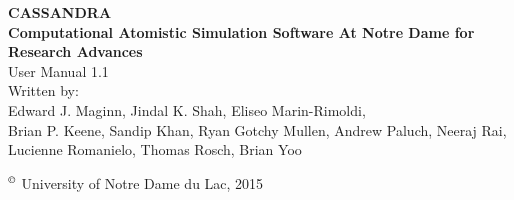 \begin{center}
\vspace*{2 in}
{\huge{\bf CASSANDRA} }\\ 
\vspace{0.5in}
{\huge { \bf  Computational Atomistic Simulation Software At Notre Dame for Research Advances}} \\
\vspace{1 in}
User Manual 1.1 \\ 
\vspace{0.2in}
Written by: \\ 
\vspace{0.2in}
Edward J. Maginn, Jindal K. Shah, Eliseo Marin-Rimoldi, \\
Brian P. Keene, Sandip Khan, Ryan Gotchy Mullen, Andrew Paluch,
Neeraj Rai, Lucienne Romanielo, Thomas Rosch, Brian Yoo
\end{center}
\vspace{1.5in}
$^\copyright$ University of Notre Dame du Lac, 2015

